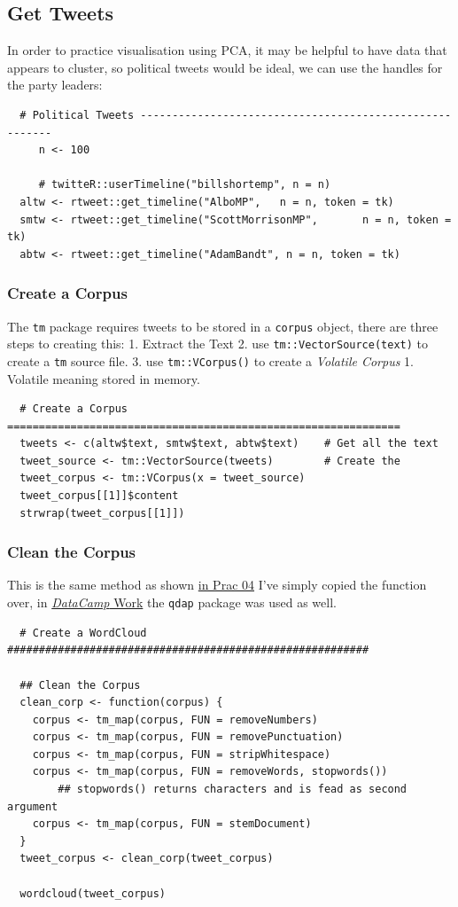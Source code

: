 \documentclass[11pt]{article}
\begin{document}
\subsection{Get Tweets}
\label{sec:orgbc51642}
In order to practice visualisation using PCA, it may be helpful to have
data that appears to cluster, so political tweets would be ideal, we can
use the handles for the party leaders:

\begin{verbatim}
  # Political Tweets --------------------------------------------------------
     n <- 100

     # twitteR::userTimeline("billshortemp", n = n)
  altw <- rtweet::get_timeline("AlboMP",   n = n, token = tk)
  smtw <- rtweet::get_timeline("ScottMorrisonMP",       n = n, token = tk)
  abtw <- rtweet::get_timeline("AdamBandt", n = n, token = tk)
\end{verbatim}

\subsubsection{Create a Corpus}
\label{sec:orgb78d988}
The \texttt{tm} package requires tweets to be stored in a \texttt{corpus} object,
there are three steps to creating this: 1. Extract the Text 2. use
\texttt{tm::VectorSource(text)} to create a \texttt{tm} source file. 3. use
\texttt{tm::VCorpus()} to create a \emph{Volatile Corpus} 1. Volatile meaning stored
in memory.

\begin{verbatim}
  # Create a Corpus ==============================================================
  tweets <- c(altw$text, smtw$text, abtw$text)    # Get all the text
  tweet_source <- tm::VectorSource(tweets)        # Create the
  tweet_corpus <- tm::VCorpus(x = tweet_source)
  tweet_corpus[[1]]$content
  strwrap(tweet_corpus[[1]])
\end{verbatim}

\subsubsection{Clean the Corpus}
\label{sec:orgef142cc}
This is the same method as shown
\href{04\_TM\_Index\_Querying\_TF-IDF.md}{in Prac 04} I've simply copied
the function over, in
\href{DataCamp/01.Introduction\_Bag\_of\_Words.md}{\emph{DataCamp} Work} the
\texttt{qdap} package was used as well.

\begin{verbatim}
  # Create a WordCloud #########################################################

  ## Clean the Corpus
  clean_corp <- function(corpus) {
    corpus <- tm_map(corpus, FUN = removeNumbers)
    corpus <- tm_map(corpus, FUN = removePunctuation)
    corpus <- tm_map(corpus, FUN = stripWhitespace)
    corpus <- tm_map(corpus, FUN = removeWords, stopwords())
        ## stopwords() returns characters and is fead as second argument
    corpus <- tm_map(corpus, FUN = stemDocument)
  }
  tweet_corpus <- clean_corp(tweet_corpus)

  wordcloud(tweet_corpus)
\end{verbatim}
\end{document}
